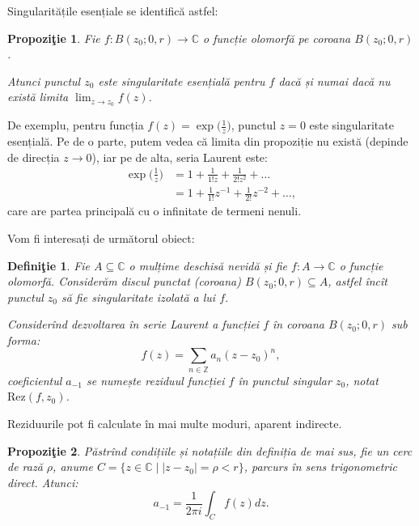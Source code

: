 \documentclass[12pt,a4paper]{article}
\newcommand\seq{\subseteq}
\newcommand\ZZ{\mathbb{Z}}
\newcommand\CC{\mathbb{C}}
\theoremstyle{dotless}
\newtheorem{proposition}{Propozi\c{t}ie}
\theoremstyle{dotlessdr}
\newtheorem{definition}{Defini\c{t}ie}
\begin{document}
Singularitățile esențiale se identifică astfel:

\begin{proposition}\label{pr:sing-es}
  Fie $ f : B(z_0; 0, r) \to \CC $ o funcție olomorfă pe coroana $ B(z_0; 0, r) $.

  Atunci punctul $ z_0 $ este singularitate esențială pentru $ f $ dacă și numai
  dacă nu există limita $ \lim_{z \to z_0} f(z) $.
\end{proposition}

De exemplu, pentru funcția $ f(z) = \exp\Big(\frac{1}{z}\Big) $, punctul $ z = 0 $
este singularitate esențială. Pe de o parte, putem vedea că limita din propoziție
nu există (depinde de direcția $ z \to 0 $), iar pe de alta, seria Laurent este:
\begin{align*}
  \exp\Big(\frac{1}{z}\Big) &= 1 + \frac{1}{1! z} + \frac{1}{2! z^2} + \dots \\
                            &= 1 + \frac{1}{1!} z^{-1} + \frac{1}{2!} z^{-2} + \dots,
\end{align*}
care are partea principală cu o infinitate de termeni nenuli.

\vspace{1cm}

Vom fi interesați de următorul obiect:

\begin{definition}\label{def:rez}
  Fie $ A \seq \CC $ o mulțime deschisă nevidă și fie $ f : A \to \CC $ o funcție
  olomorfă. Considerăm discul punctat (coroana) $ B(z_0; 0, r) \seq A $, astfel
  încît punctul $ z_0 $ să fie singularitate izolată a lui $ f $.

  Considerînd dezvoltarea în serie Laurent a funcției $ f $ în coroana $ B(z_0; 0,r) $
  sub forma:
  \[
    f(z) = \sum_{n \in \ZZ} a_n (z - z_0)^n,
  \]
  coeficientul $ a_{-1} $ se numește \emph{reziduul funcției} $ f $ în punctul
  singular $ z_0 $, notat $ \mathrm{Rez}(f, z_0) $.
\end{definition}

Reziduurile pot fi calculate în mai multe moduri, aparent indirecte.

\begin{proposition}\label{pr:rez}
  Păstrînd condițiile și notațiile din definiția de mai sus, fie un cerc
  de rază $ \rho $, anume $ C = \{ z \in \CC \mid |z - z_0| = \rho < r \} $, parcurs
  în sens trigonometric direct. Atunci:
  \[
    a_{-1} = \frac{1}{2 \pi i} \int_C f(z) dz.
  \]
\end{proposition}
\end{document}
